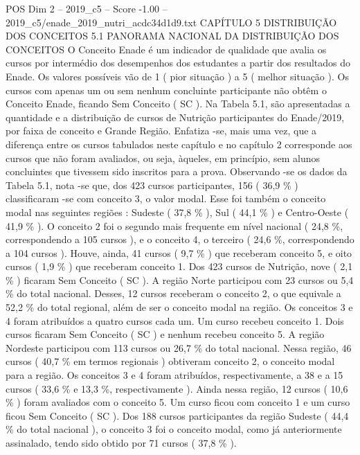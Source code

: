 \begin{textsample}{POS Dim 2 – 2019\_c5 – Score -1.00 – 2019\_c5/enade\_2019\_nutri\_acdc34d1d9.txt}  \label{ex:f2_pos_344}
CAPÍTULO 5 DISTRIBUIÇÃO DOS CONCEITOS 5.1 PANORAMA NACIONAL DA DISTRIBUIÇÃO DOS CONCEITOS O Conceito Enade é um indicador de qualidade que avalia os cursos por intermédio dos desempenhos dos estudantes a partir dos resultados do Enade.
Os valores possíveis vão de 1 ( pior situação ) a 5 ( melhor situação ).
Os cursos com apenas um ou sem nenhum concluinte participante não obtêm o Conceito Enade, ficando Sem Conceito ( SC ).
Na Tabela 5.1, são apresentadas a quantidade e a distribuição de cursos de Nutrição participantes do Enade/2019, por faixa de conceito e Grande Região.
Enfatiza -se, mais uma vez, que a diferença entre os cursos tabulados neste capítulo e no capítulo 2 corresponde aos cursos que não foram avaliados, ou seja, àqueles, em princípio, sem alunos concluintes que tivessem sido inscritos para a prova.
Observando -se os dados da Tabela 5.1, nota -se que, dos 423 cursos participantes, 156 ( 36,9 \% ) classificaram -se com conceito 3, o valor modal.
Esse foi também o conceito modal nas seguintes regiões : Sudeste ( 37,8 \% ), Sul ( 44,1 \% ) e Centro-Oeste ( 41,9 \% ).
O conceito 2 foi o segundo mais frequente em nível nacional ( 24,8 \%, correspondendo a 105 cursos ), e o conceito 4, o terceiro ( 24,6 \%, correspondendo a 104 cursos ).
Houve, ainda, 41 cursos ( 9,7 \% ) que receberam conceito 5, e oito cursos ( 1,9 \% ) que receberam conceito 1.
Dos 423 cursos de Nutrição, nove ( 2,1 \% ) ficaram Sem Conceito ( SC ).
A região Norte participou com 23 cursos ou 5,4 \% do total nacional.
Desses, 12 cursos receberam o conceito 2, o que equivale a 52,2 \% do total regional, além de ser o conceito modal na região.
Os conceitos 3 e 4 foram atribuídos a quatro cursos cada um.
Um curso recebeu conceito 1.
Dois cursos ficaram Sem Conceito ( SC ) e nenhum recebeu conceito 5.
A região Nordeste participou com 113 cursos ou 26,7 \% do total nacional.
Nessa região, 46 cursos ( 40,7 \% em termos regionais ) obtiveram conceito 2, o conceito modal para a região.
Os conceitos 3 e 4 foram atribuídos, respectivamente, a 38 e a 15 cursos ( 33,6 \% e 13,3 \%, respectivamente ).
Ainda nessa região, 12 cursos ( 10,6 \% ) foram avaliados com o conceito 5.
Um curso ficou com conceito 1 e um curso ficou Sem Conceito ( SC ).
Dos 188 cursos participantes da região Sudeste ( 44,4 \% do total nacional ), o conceito 3 foi o conceito modal, como já anteriormente assinalado, tendo sido obtido por 71 cursos ( 37,8 \% ).

\end{textsample}
